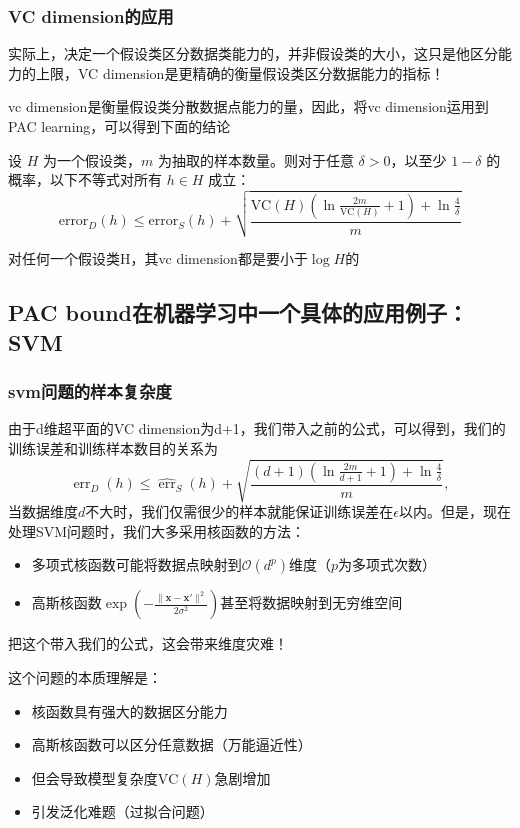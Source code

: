 \documentclass[lang=cn,newtx,10pt,scheme=chinese,chinesefont=nofont,citestyle=gb7714-2015, bibstyle=gb7714-2015]{elegantbook}
\begin{document}
\begin{refsection}
\subsubsection{VC dimension的应用}
实际上，决定一个假设类区分数据类能力的，并非假设类的大小，这只是他区分能力的上限，VC dimension是更精确的衡量假设类区分数据能力的指标！

vc dimension是衡量假设类分散数据点能力的量，因此，将vc dimension运用到PAC learning，可以得到下面的结论
\begin{theorem}
设 \( H \) 为一个假设类，\( m \) 为抽取的样本数量。则对于任意 \(\delta > 0\)，以至少 \(1 - \delta\) 的概率，以下不等式对所有 \(h \in H\) 成立：
\[
\text{error}_D(h) \leq \text{error}_S(h) + \sqrt{\frac{\text{VC}(H)\left(\ln\frac{2m}{\text{VC}(H)} + 1\right) + \ln\frac{4}{\delta}}{m}}
\]
\end{theorem}
对任何一个假设类H，其vc dimension都是要小于$\log H$的
\subsection{PAC bound在机器学习中一个具体的应用例子：SVM}
\subsubsection{svm问题的样本复杂度}
由于d维超平面的VC dimension为d+1，我们带入之前的公式，可以得到，我们的训练误差和训练样本数目的关系为
\[
\operatorname{err}_D(h) \leq \widehat{\operatorname{err}}_S(h) + \sqrt{\frac{(d+1)\left(\ln\frac{2m}{d+1} + 1\right) + \ln\frac{4}{\delta}}{m}},
\]
当数据维度$d$不大时，我们仅需很少的样本就能保证训练误差在$\epsilon$以内。但是，现在处理SVM问题时，我们大多采用核函数的方法：

\begin{itemize}
    \item 多项式核函数可能将数据点映射到$\mathcal{O}(d^p)$维度（$p$为多项式次数）
    \item 高斯核函数$\exp\left(-\frac{\|\mathbf{x}-\mathbf{x}'\|^2}{2\sigma^2}\right)$甚至将数据映射到无穷维空间
\end{itemize}

把这个带入我们的公式，这会带来维度灾难！

这个问题的本质理解是：
\begin{itemize}
    \item 核函数具有强大的数据区分能力
    \item 高斯核函数可以区分任意数据（万能逼近性）
    \item 但会导致模型复杂度$\text{VC}(H)$急剧增加
    \item 引发泛化难题（过拟合问题）
\end{itemize}

\end{refsection}
\end{document}
